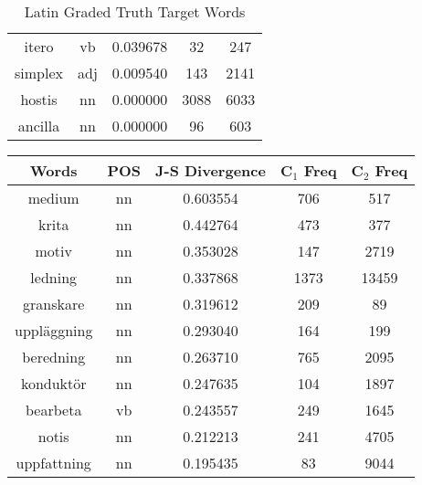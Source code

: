 \begin{table}
\begin{tabular}{ccccc}
itero            & vb            & 0.039678           & 32                 & 247                 \\
simplex          & adj           & 0.009540           & 143                & 2141                \\
hostis           & nn            & 0.000000           & 3088               & 6033                \\
ancilla          & nn            & 0.000000           & 96                 & 603                 \\
\bottomrule
\end{tabular}
\caption{Latin Graded Truth Target Words}
\label{tab:lat-truthtargets}
\end{table}



\begin{table}
\centering
\begin{tabular}{ccccc} 
\toprule
\textbf{ Words } & \textbf{ POS } & \textbf{ J-S Divergence } & \textbf{ C$_1$ Freq } & \textbf{ C$_2$ Freq }  \\ 
\midrule
medium           & nn            & 0.603554           & 706                & 517                 \\
krita            & nn            & 0.442764           & 473                & 377                 \\
motiv            & nn            & 0.353028           & 147                & 2719                \\
ledning          & nn            & 0.337868           & 1373               & 13459               \\
granskare        & nn            & 0.319612           & 209                & 89                  \\
uppläggning      & nn            & 0.293040           & 164                & 199                 \\
beredning        & nn            & 0.263710           & 765                & 2095                \\
konduktör        & nn            & 0.247635           & 104                & 1897                \\
bearbeta         & vb            & 0.243557           & 249                & 1645                \\
notis            & nn            & 0.212213           & 241                & 4705                \\
uppfattning      & nn            & 0.195435           & 83                 & 9044                \\

\end{tabular}
\end{table}
